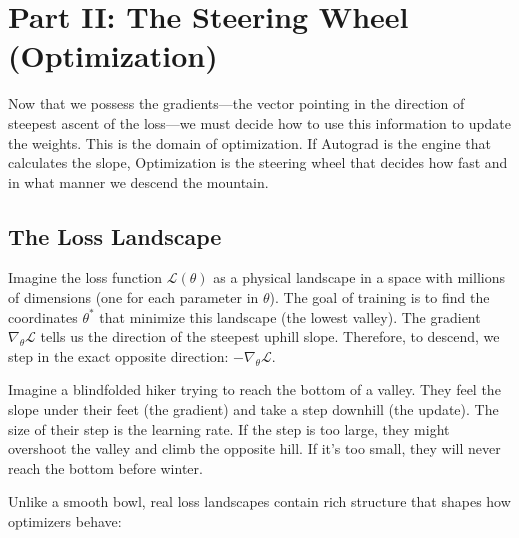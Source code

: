 \documentclass{tufte-handout}
\begin{document}
\section{Part II: The Steering Wheel (Optimization)}

Now that we possess the gradients—the vector pointing in the direction of steepest ascent of the loss—we must decide how to use this information to update the weights. This is the domain of optimization. If Autograd is the engine that calculates the slope, Optimization is the steering wheel that decides how fast and in what manner we descend the mountain.

\subsection{The Loss Landscape}

Imagine the loss function $\mathcal{L}(\theta)$ as a physical landscape in a space with millions of dimensions (one for each parameter in $\theta$). The goal of training is to find the coordinates $\theta^*$ that minimize this landscape (the lowest valley). The gradient $\nabla_\theta \mathcal{L}$ tells us the direction of the steepest uphill slope. Therefore, to descend, we step in the exact opposite direction: $-\nabla_\theta \mathcal{L}$.

\begin{marginfigure}[-2.0cm]
\centering
\begin{tcolorbox}[colback=wp-light, colframe=wp-accent, title=\textbf{Intuition: The Blind Hiker}]
Imagine a blindfolded hiker trying to reach the bottom of a valley. They feel the slope under their feet (the gradient) and take a step downhill (the update). The size of their step is the learning rate. If the step is too large, they might overshoot the valley and climb the opposite hill. If it's too small, they will never reach the bottom before winter.
\end{tcolorbox}
\end{marginfigure}

Unlike a smooth bowl, real loss landscapes contain rich structure that shapes how optimizers behave:
\end{document}
